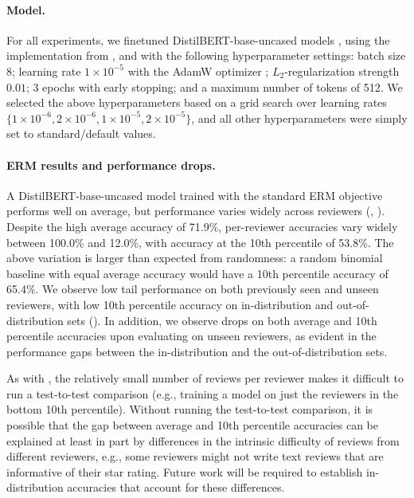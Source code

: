 \paragraph{Model.}
For all experiments, we finetuned DistilBERT-base-uncased models \citep{sanh2019distilbert}, using the implementation from \citet{wolf2019transformers}, and with the following hyperparameter settings:
batch size 8; learning rate $1 \times 10^{-5}$ with the AdamW optimizer \citep{loshchilov2019decoupled}; $L_2$-regularization strength $0.01$; 3 epochs with early stopping; and a maximum number of tokens of 512.
We selected the above hyperparameters based on a grid search over learning rates $\{1 \times 10^{-6}, 2 \times 10^{-6}, 1 \times 10^{-5}, 2 \times 10^{-5}\}$, and all other hyperparameters were simply set to standard/default values.


\paragraph{ERM results and performance drops.}
A DistilBERT-base-uncased model trained with the standard ERM objective performs well on average, but performance varies widely across reviewers (, ).
Despite the high average accuracy of 71.9\%, per-reviewer accuracies vary widely between 100.0\% and 12.0\%, with accuracy at the 10th percentile of 53.8\%.
The above variation is larger than expected from randomness: a random binomial baseline with equal average accuracy would have a 10th percentile accuracy of 65.4\%.
We observe low tail performance on both previously seen and unseen reviewers, with low 10th percentile accuracy on in-distribution and out-of-distribution sets ().
In addition, we observe drops on both average and 10th percentile accuracies upon evaluating on unseen reviewers, as evident in the performance gaps between the in-distribution and the out-of-distribution sets.

As with \CivilComments, the relatively small number of reviews per reviewer makes it difficult to run a test-to-test comparison (e.g., training a model on just the reviewers in the bottom 10th percentile).
Without running the test-to-test comparison, it is possible that the gap between average and 10th percentile accuracies can be explained at least in part by differences in the intrinsic difficulty of reviews from different reviewers,
e.g., some reviewers might not write text reviews that are informative of their star rating.
Future work will be required to establish in-distribution accuracies that account for these differences.


